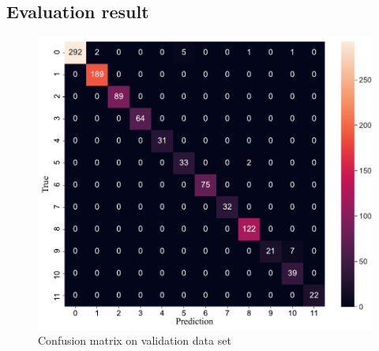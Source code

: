 \begin{landscape}
\makeatletter
\let\savedchap\@makechapterhead
\def\@makechapterhead{\vspace*{-2.8cm}\savedchap}
\chapter{Evaluation result}
\let\@makechapterhead\savedchap
\makeatother
\vspace*{-1em}
\label{chap:Evaluation result}
\begin{minipage}{.715\textwidth}
\begin{figure}[H]
    \centering
    \includegraphics[width=\textwidth]{evaluation/imgs/5-confusion_matrix_val.pdf}
    \caption{Confusion matrix on validation data set}
    \label{fig:5-confusion_matrix_val}
\end{figure}
\end{minipage}
\hspace{.8em}
\begin{minipage}{.715\textwidth}
\begin{figure}[H]
    \centering

\end{figure}
\end{minipage}
\end{landscape}
